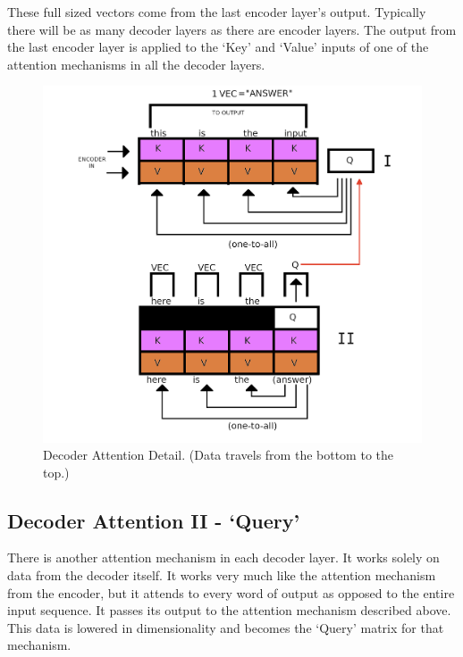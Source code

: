 These full sized vectors come from the last encoder layer's output. Typically there will be as many decoder layers as there are encoder layers. The output from the last encoder layer is applied to the `Key' and `Value' inputs of one of the attention mechanisms in all the decoder layers.
\begin{figure}[H]
	\begin{center}
		
		
		\includegraphics[scale=0.75]{diagram-graph-decoder-flow-a}
	\end{center}
	\caption[Decoder Attention Detail]{Decoder Attention Detail. (Data travels from the bottom to the top.)}
	
	
\end{figure}


\subsection{Decoder Attention II - `Query'}
There is another attention mechanism in each decoder layer. It works solely on data from the decoder itself. It works very much like the attention mechanism from the encoder, but it attends to every word of output as opposed to the entire input sequence. It passes its output to the attention mechanism described above. This data is lowered in dimensionality and becomes the `Query' matrix for that mechanism. 

